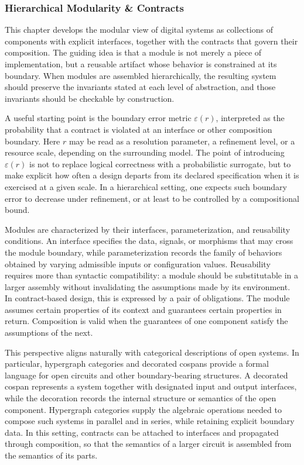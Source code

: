 \documentclass[11pt]{article}
\begin{document}
\subsubsection{Hierarchical Modularity \& Contracts}

This chapter develops the modular view of digital systems as collections of components with explicit interfaces, together with the contracts that govern their composition. The guiding idea is that a module is not merely a piece of implementation, but a reusable artifact whose behavior is constrained at its boundary. When modules are assembled hierarchically, the resulting system should preserve the invariants stated at each level of abstraction, and those invariants should be checkable by construction.

A useful starting point is the boundary error metric \(\varepsilon(r)\), interpreted as the probability that a contract is violated at an interface or other composition boundary. Here \(r\) may be read as a resolution parameter, a refinement level, or a resource scale, depending on the surrounding model. The point of introducing \(\varepsilon(r)\) is not to replace logical correctness with a probabilistic surrogate, but to make explicit how often a design departs from its declared specification when it is exercised at a given scale. In a hierarchical setting, one expects such boundary error to decrease under refinement, or at least to be controlled by a compositional bound.

Modules are characterized by their interfaces, parameterization, and reusability conditions. An interface specifies the data, signals, or morphisms that may cross the module boundary, while parameterization records the family of behaviors obtained by varying admissible inputs or configuration values. Reusability requires more than syntactic compatibility: a module should be substitutable in a larger assembly without invalidating the assumptions made by its environment. In contract-based design, this is expressed by a pair of obligations. The module assumes certain properties of its context and guarantees certain properties in return. Composition is valid when the guarantees of one component satisfy the assumptions of the next.

This perspective aligns naturally with categorical descriptions of open systems. In particular, hypergraph categories and decorated cospans provide a formal language for open circuits and other boundary-bearing structures. A decorated cospan represents a system together with designated input and output interfaces, while the decoration records the internal structure or semantics of the open component. Hypergraph categories supply the algebraic operations needed to compose such systems in parallel and in series, while retaining explicit boundary data. In this setting, contracts can be attached to interfaces and propagated through composition, so that the semantics of a larger circuit is assembled from the semantics of its parts.
\end{document}
